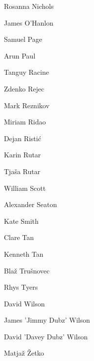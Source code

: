 \begin{tcolorbox}
\begin{fullwidth}
\begin{multicols}{2}
Rosanna Nichols  
 
James O'Hanlon 
 
Samuel Page 
 
Arun Paul  
 
Tanguy Racine 
 
Zdenko Rejec 
 
Mark Reznikov  
 
Miriam Ridao 
 
Dejan Ristić 
 
Karin Rutar 
 
Tja\v{s}a Rutar 
 
William Scott 
 
Alexander Seaton 
 
Kate Smith 
 
Clare Tan 
 
Kenneth Tan 
 
Bla\v{z} Tru\v{s}novec 
 
Rhys Tyers 
 
David Wilson 
 
James 'Jimmy Dubz' Wilson 
 
David 'Davey Dubz' Wilson   
 
Matja\v{z} \v{Z}etko 
 
\end{multicols} 
 \end{fullwidth} 
 \end{tcolorbox} 
